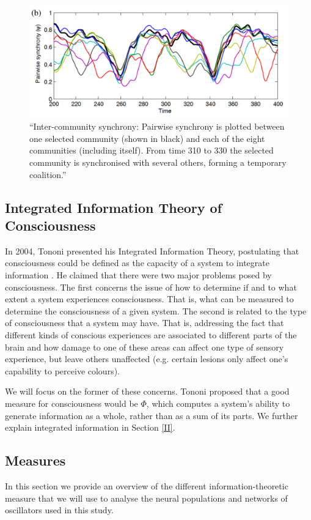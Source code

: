 \documentclass[a4paper,11pt]{article}
\begin{document}
\begin{figure}[H]
\centering
\includegraphics[scale = 0.5]{Shanahan2010_Chimera}
\caption{
	``Inter-community synchrony: Pairwise synchrony is plotted between one selected community (shown in black) and each of the eight communities (including itself). From time 310 to 330 the selected community is synchronised with several others, forming a temporary coalition.'' \cite{Shanahan2010}
	\label{Shanahan2010_Chimera}
}
\end{figure}

\subsection{Integrated Information Theory of Consciousness}
In 2004, Tononi presented his Integrated Information Theory, postulating that consciousness could be defined as the capacity of a system to integrate information \cite{Tononi2004}. He claimed that there were two major problems posed by consciousness. The first concerns the issue of how to determine if and to what extent a system experiences consciousness. That is, what can be measured to determine the consciousness of a given system. The second is related to the type of consciousness that a system may have. That is, addressing the fact that different kinds of conscious experiences are associated to different parts of the brain and how damage to one of these areas can affect one type of sensory experience, but leave others unaffected (e.g. certain lesions only affect one's capability to perceive colours).

We will focus on the former of these concerns. Tononi proposed that a good measure for consciousness would be $\Phi$, which computes a system's ability to generate information as a whole, rather than as a sum of its parts. We further explain integrated information in Section \ref{II}.

\subsection{Measures}
\label{Measures}
In this section we provide an overview of the different information-theoretic measure that we will use to analyse the neural populations and networks of oscillators used in this study.
\end{document}
